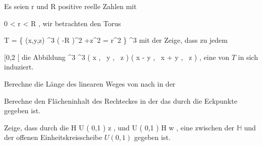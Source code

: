 {}
{

Es seien
\mathkor {} {r} {und} {R} {}
positive reelle Zahlen mit

\mavergleichskette
{\vergleichskette
{ 0
}
{ < }{ r
}
{ < }{ R
}
{    }{
}
{   }{
}
}
{}{}{,}
wir betrachten den
 {} {}
Torus

\mavergleichskettedisp
{\vergleichskette
{ T
}
{ =} { \left\{ (x,y,z) \in \R^3  \mid   \left(   -R  \right)^2 +z^2  = r^2         \right\}
}
{ \subseteq} { \R^3
}
{ } {
}
{ } {
}
}
{}{}{}
mit der
Zeige, dass zu jedem

\mavergleichskette
{\vergleichskette
{ \alpha
}
{ \in }{ [0,2 \pi [
}
{  }{
}
{    }{
}
{   }{
}
}
{}{}{}
die Abbildung
\maabbeledisp {\Psi_\alpha} {\R^3} {\R^3
} { \left(  x   , \,   y  , \,  z                 \right) } { \left(  x \cos \alpha - y \sin  \alpha   , \,   x \sin \alpha + y \cos  \alpha  , \,  z                 \right)
} {,}
eine
von $T$ in sich induziert.

}
{} {}

{}
{

Berechne die Länge des linearen Weges von
 nach
 in der

}
{} {}

{}
{

Berechne den Flächeninhalt des Rechteckes in der
das durch die Eckpunkte
 gegeben ist.

}
{} {}

{}
{

Zeige, dass durch die
\maabbeledisp {\varphi} { {\mathbb H} } { U \left(  0,1  \right)
} { z} { {  }
} {,}
und
\maabbeledisp {\psi} {  U \left(  0,1  \right)  } { {\mathbb H}
} {w} { {  }
} {,}
eine
zwischen der
${\mathbb H}$ und der offenen Einheitskreisscheibe $U \left(  0,1  \right)$ gegeben ist.

}
{} {}

